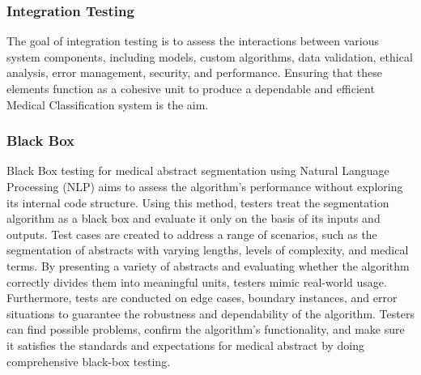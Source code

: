 \documentclass[12pt,a4paper]{report}     %
\begin{document}
\begin{normalsize}
{{{\subsubsection{Integration Testing}
The goal of integration testing is to assess the interactions between various system components, including models, custom algorithms, data validation, ethical analysis, error management, security, and performance. Ensuring that these elements function as a cohesive unit to produce a dependable and efficient Medical Classification system is the aim.
\subsubsection{Black Box}
Black Box testing for medical abstract segmentation using Natural Language Processing (NLP) aims to assess the algorithm's performance without exploring its internal code structure. Using this method, testers treat the segmentation algorithm as a black box and evaluate it only on the basis of its inputs and outputs. Test cases are created to address a range of scenarios, such as the segmentation of abstracts with varying lengths, levels of complexity, and medical terms. By presenting a variety of abstracts and evaluating whether the algorithm correctly divides them into meaningful units, testers mimic real-world usage. Furthermore, tests are conducted on edge cases, boundary instances, and error situations to guarantee the robustness and dependability of the algorithm. Testers can find possible problems, confirm the algorithm's functionality, and make sure it satisfies the standards and expectations for medical abstract by doing comprehensive black-box testing.

}}}
\end{normalsize}
\end{document}
